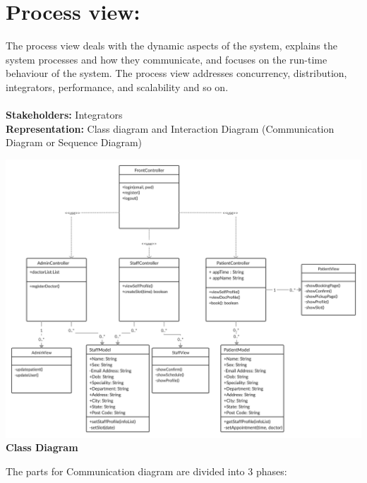 \documentclass[a4paper,12pt]{report}
\begin{document}
\section*{Process view:}
The process view deals with the dynamic aspects of the system, explains the system processes and how they communicate, and focuses on the run-time behaviour of the system. The process view addresses concurrency, distribution, integrators, performance, and scalability and so on.\\\\
\textbf{Stakeholders:} Integrators\\
\textbf{Representation:} Class diagram and Interaction Diagram (Communication Diagram or Sequence Diagram)\\
\begin{center}
        \includegraphics[scale=.2]{UML/class.png}\\
        \textbf{Class Diagram}
\end{center}
\vspace{0.5cm}    
The parts for Communication diagram are divided into 3 phases:
\vspace{0.5cm}
\end{document}
